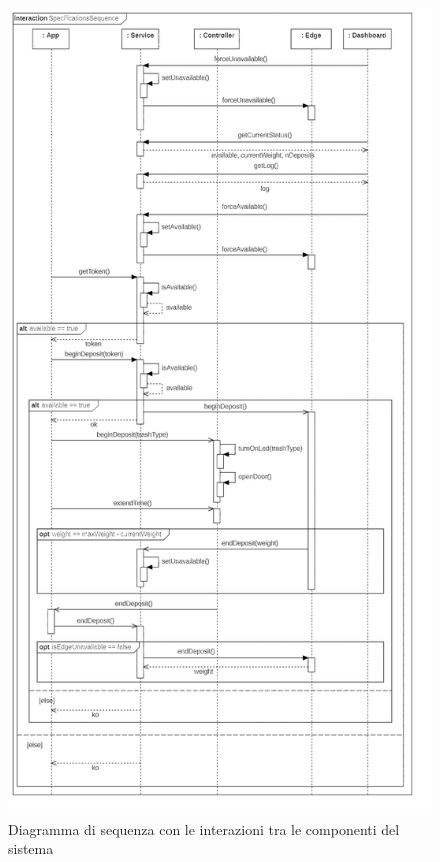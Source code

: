 \documentclass[a4paper, 12pt]{report}
\begin{document}
	\begin{figure}[H]
		\centering
		\includegraphics[height=\textheight]{"img/Sequence"}    
		\caption{Diagramma di sequenza con le interazioni tra le componenti del sistema}
	\end{figure}
\end{document}
